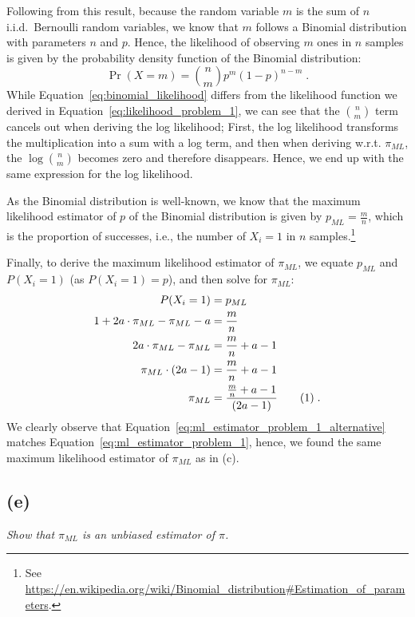 \documentclass{article}
\newcommand{\stepandtag}{%
  \refstepcounter{equation}%
  \tag{\theequation}%
}
\newcommand{\piml}{\ensuremath{\pi_{ML}}}
\begin{document}
Following from this result, because the random variable $m$ is the sum of $n$ i.i.d.\ Bernoulli random variables, we know that $m$ follows a Binomial distribution with parameters $n$ and $p$.
Hence, the likelihood of observing $m$ ones in $n$ samples is given by the probability density function of the Binomial distribution:
\begin{equation}
    \Pr(X=m) = \binom{n}{m} p^m (1-p)^{n-m} \label{eq:binomial_likelihood}\;.
\end{equation}
While Equation~\ref{eq:binomial_likelihood} differs from the likelihood function we derived in Equation~\ref{eq:likelihood_problem_1}, we can see that the $\binom{n}{m}$ term cancels out when deriving the log likelihood; First, the log likelihood transforms the multiplication into a sum with a log term, and then when deriving w.r.t. $\pi_{ML}$, the $\log \binom{n}{m}$ becomes zero and therefore disappears. Hence, we end up with the same expression for the log likelihood.

As the Binomial distribution is well-known, we know that the maximum likelihood estimator of $p$ of the Binomial distribution is given by $p_{ML} = \frac{m}{n}$, which is the proportion of successes, i.e., the number of $X_i=1$ in $n$ samples.\!\footnote{See \url{https://en.wikipedia.org/wiki/Binomial_distribution\#Estimation_of_parameters}.}

Finally, to derive the maximum likelihood estimator of $\pi_{ML}$, we equate $p_{ML}$ and $P(X_i=1)$ (as $P(X_i=1) = p$), and then solve for $\pi_{ML}$:
\begin{align*}
    P(X_i=1) &= p_{ML} \\
    1 + 2a \cdot \pi_{ML} - \pi_{ML} - a &= \frac{m}{n} \\
    2a \cdot \pi_{ML} - \pi_{ML} &= \frac{m}{n} + a - 1 \\
    \pi_{ML} \cdot (2a -1) &= \frac{m}{n} + a - 1 \\
    \pi_{ML} &= \frac{\frac{m}{n} + a - 1}{(2a -1)} \stepandtag \label{eq:ml_estimator_problem_1_alternative}\;.
\end{align*}
We clearly observe that Equation~\ref{eq:ml_estimator_problem_1_alternative} matches Equation~\ref{eq:ml_estimator_problem_1}, hence, we found the same maximum likelihood estimator of $\pi_{ML}$ as in (c).


\subsection*{(e)}
\textit{Show that $\piml$ is an unbiased estimator of $\pi$.}
\end{document}

